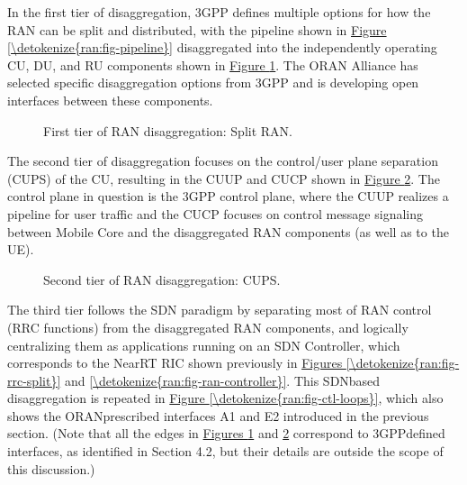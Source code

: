 \documentclass[a4paper,11pt,english]{sphinxmanual}
\let\sphinxpxdimen\pdfpxdimen\else\newdimen\sphinxpxdimen
\begin{document}
\sphinxAtStartPar
In the first tier of disaggregation, 3GPP defines multiple options for
how the RAN can be split and distributed, with the pipeline shown in
\hyperref[\detokenize{ran:fig-pipeline}]{Figure \ref{\detokenize{ran:fig-pipeline}}} disaggregated into the
independently operating CU, DU, and RU components shown in
\hyperref[\detokenize{ran:fig-disagg1}]{Figure \ref{\detokenize{ran:fig-disagg1}}}. The O\sphinxhyphen{}RAN Alliance has selected
specific disaggregation options from 3GPP and is developing open
interfaces between these components.

\begin{figure}[ht]
\centering
\capstart

\noindent\sphinxincludegraphics[width=450\sphinxpxdimen]{{Slide72}.png}
\caption{First tier of RAN disaggregation: Split RAN.}\label{\detokenize{ran:id12}}\label{\detokenize{ran:fig-disagg1}}\end{figure}

\sphinxAtStartPar
The second tier of disaggregation focuses on the control/user plane
separation (CUPS) of the CU, resulting in the CU\sphinxhyphen{}UP and CU\sphinxhyphen{}CP shown in
\hyperref[\detokenize{ran:fig-disagg2}]{Figure \ref{\detokenize{ran:fig-disagg2}}}. The control plane in question is
the 3GPP control plane, where the CU\sphinxhyphen{}UP realizes a pipeline for user
traffic and the CU\sphinxhyphen{}CP focuses on control message signaling between
Mobile Core and the disaggregated RAN components (as well as to the
UE).

\begin{figure}[ht]
\centering
\capstart

\noindent\sphinxincludegraphics[width=450\sphinxpxdimen]{{Slide82}.png}
\caption{Second tier of RAN disaggregation: CUPS.}\label{\detokenize{ran:id13}}\label{\detokenize{ran:fig-disagg2}}\end{figure}

\sphinxAtStartPar
The third tier follows the SDN paradigm by separating most of RAN
control (RRC functions) from the disaggregated RAN components, and
logically centralizing them as applications running on an SDN
Controller, which corresponds to the Near\sphinxhyphen{}RT RIC shown previously in
\hyperref[\detokenize{ran:fig-rrc-split}]{Figures \ref{\detokenize{ran:fig-rrc-split}}} and \hyperref[\detokenize{ran:fig-ran-controller}]{\ref{\detokenize{ran:fig-ran-controller}}}. This SDN\sphinxhyphen{}based disaggregation is repeated in
\hyperref[\detokenize{ran:fig-ctl-loops}]{Figure \ref{\detokenize{ran:fig-ctl-loops}}}, which also shows the
O\sphinxhyphen{}RAN\sphinxhyphen{}prescribed interfaces A1 and E2 introduced in the previous
section. (Note that all the edges in \hyperref[\detokenize{ran:fig-disagg1}]{Figures \ref{\detokenize{ran:fig-disagg1}}} and \hyperref[\detokenize{ran:fig-disagg2}]{\ref{\detokenize{ran:fig-disagg2}}} correspond to
3GPP\sphinxhyphen{}defined interfaces, as identified in Section 4.2, but their
details are outside the scope of this discussion.)
\end{document}
